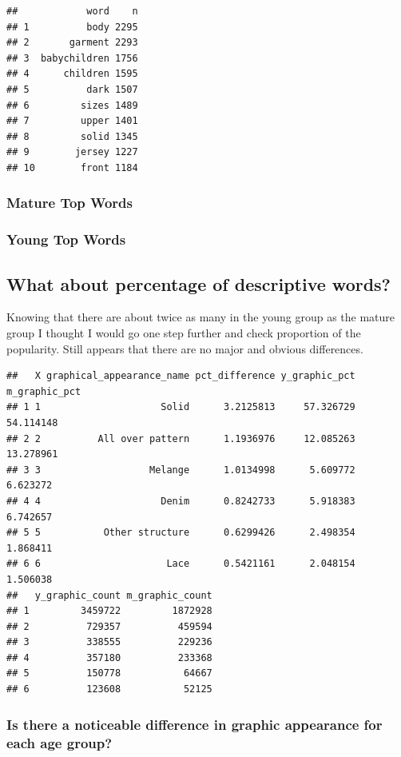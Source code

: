 \documentclass[
]{article}
\begin{document}
\begin{verbatim}
##            word    n
## 1          body 2295
## 2       garment 2293
## 3  babychildren 1756
## 4      children 1595
## 5          dark 1507
## 6         sizes 1489
## 7         upper 1401
## 8         solid 1345
## 9        jersey 1227
## 10        front 1184
\end{verbatim}

\hypertarget{mature-top-words}{%
\subsubsection{Mature Top Words}\label{mature-top-words}}

\hypertarget{young-top-words}{%
\subsubsection{Young Top Words}\label{young-top-words}}

\hypertarget{what-about-percentage-of-descriptive-words}{%
\subsection{What about percentage of descriptive
words?}\label{what-about-percentage-of-descriptive-words}}

Knowing that there are about twice as many in the young group as the
mature group I thought I would go one step further and check proportion
of the popularity. Still appears that there are no major and obvious
differences.

\begin{verbatim}
##   X graphical_appearance_name pct_difference y_graphic_pct m_graphic_pct
## 1 1                     Solid      3.2125813     57.326729     54.114148
## 2 2          All over pattern      1.1936976     12.085263     13.278961
## 3 3                   Melange      1.0134998      5.609772      6.623272
## 4 4                     Denim      0.8242733      5.918383      6.742657
## 5 5           Other structure      0.6299426      2.498354      1.868411
## 6 6                      Lace      0.5421161      2.048154      1.506038
##   y_graphic_count m_graphic_count
## 1         3459722         1872928
## 2          729357          459594
## 3          338555          229236
## 4          357180          233368
## 5          150778           64667
## 6          123608           52125
\end{verbatim}

\hypertarget{is-there-a-noticeable-difference-in-graphic-appearance-for-each-age-group}{%
\subsubsection{Is there a noticeable difference in graphic appearance
for each age
group?}\label{is-there-a-noticeable-difference-in-graphic-appearance-for-each-age-group}}
\end{document}
